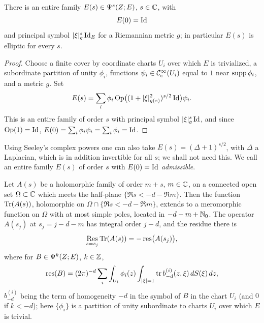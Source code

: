 \begin{proposition}\label{eta:prop:admissible}
There is an entire family $E(s)\in\Psi^{s}(Z;E)$, $s\in\mathbb{C}$, with
\[
E(0)=\operatorname{Id}
\]
and principal symbol $\lvert \xi\rvert_g^s\operatorname{Id}_E$ for a Riemannian metric $g$; in particular
$E(s)$ is elliptic for every $s$.
\end{proposition}

\begin{proof} Choose a finite cover by coordinate charts $U_i$ over which $E$ is
trivialized, a subordinate partition of unity $\phi_i$, functions
$\psi_i\in\mathcal{C}^\infty_{\mathrm{c}}(U_i)$ equal to $1$ near $\operatorname{supp}\phi_i$, and a metric $g$. Set
\[
E(s)=\sum_i\phi_i\operatorname{Op}\bigl((1+\lvert \xi\rvert_{g(z)}^2)^{s/2}\operatorname{Id}\bigr)\psi_i.
\]
This is an entire family of order $s$ with principal symbol $\lvert \xi\rvert_g^s\operatorname{Id}$, and since
$\operatorname{Op}(1)=\operatorname{Id}$, $E(0)=\sum_i\phi_i\psi_i=\sum_i\phi_i=\operatorname{Id}$.
\end{proof}

Using Seeley's complex powers \cite{Seeley} one can also take $E(s)=(\Delta+1)^{s/2}$,
with $\Delta$ a Laplacian, which is in addition invertible for all $s$; we shall not
need this. We call an entire family $E(s)$ of order $s$ with $E(0)=\operatorname{Id}$
\emph{admissible}.

\begin{theorem}[Seeley]\label{eta:thm:seeley}
Let $A(s)$ be a holomorphic family of order $m+s$, $m\in\mathbb{C}$, on a connected open set
$\Omega\subset\mathbb{C}$ which meets the half-plane $\{\Re s<-d-\Re m\}$. Then the function
$\operatorname{Tr}(A(s))$, holomorphic on $\Omega\cap\{\Re s<-d-\Re m\}$, extends to a meromorphic
function on $\Omega$ with at most simple poles, located in $-d-m+\mathbb{N}_0$. The operator $A(s_j)$ at $s_j=j-d-m$ has integral order $j-d$, and the residue there is
\begin{equation}\label{eta:eq:seeley-residue}
\operatorname*{Res}_{s=s_j}\operatorname{Tr}(A(s))=-\operatorname{res}\bigl(A(s_j)\bigr),
\end{equation}
where for $B\in\Psi^{k}(Z;E)$, $k\in\mathbb{Z}$,
\[
\operatorname{res}(B)=(2\pi)^{-d}\sum_i\int_{U_i}\phi_i(z)\int_{\lvert \xi\rvert=1}\operatorname{tr} b^{(i)}_{-d}(z,\xi)\,dS(\xi)\,dz,
\]
$b^{(i)}_{-d}$ being the term of homogeneity $-d$ in the symbol of $B$ in the chart $U_i$
(and $0$ if $k<-d$); here $\{\phi_i\}$ is a partition of unity subordinate to charts
$U_i$ over which $E$ is trivial.
\end{theorem}

